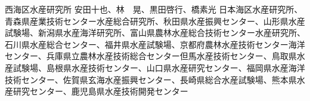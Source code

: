 {西海区水産研究所}%
{安田十也、林　晃、黒田啓行、橋素光}%
{日本海区水産研究所、青森県産業技術センター水産総合研究所、秋田県水産振興センター、山形県水産試験場、新潟県水産海洋研究所、富山県農林水産総合技術センター水産研究所、石川県水産総合センター、福井県水産試験場、京都府農林水産技術センター海洋センター、兵庫県立農林水産技術総合センター但馬水産技術センター、鳥取県水産試験場、島根県水産技術センター、山口県水産研究センター、福岡県水産海洋技術センター、佐賀県玄海水産振興センター、長崎県総合水産試験場、熊本県水産研究センター、鹿児島県水産技術開発センター}%
